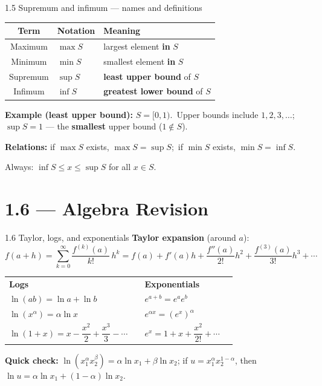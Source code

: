 \documentclass[11pt,aspectratio=169]{beamer}
\begin{document}
\begin{frame}{1.5 Supremum and infimum --- names and definitions}
  \scriptsize
  \begin{tabular}{@{}clp{}@{}}
    \toprule
    \textbf{Term} & \textbf{Notation} & \textbf{Meaning} \\
    \midrule
    Maximum & $\max S$ & largest element \textbf{in} $S$ \\
    Minimum & $\min S$ & smallest element \textbf{in} $S$ \\
    Supremum & $\sup S$ & \textbf{least upper bound} of $S$ \\
    Infimum & $\inf S$ & \textbf{greatest lower bound} of $S$ \\
    \bottomrule
  \end{tabular}

  \medskip
  \textbf{Example (least upper bound):}\quad
  $S=[0,1)$.\ Upper bounds include $1,2,3,\ldots$;
  $\sup S=1$ --- the \textbf{smallest} upper bound ($1\notin S$).

  \medskip
  \textbf{Relations:}\quad
  if $\max S$ exists, $\max S=\sup S$;\ if $\min S$ exists, $\min S=\inf S$.

  \smallskip
  \hspace{2.1em}Always: $\inf S\le x\le\sup S$ for all $x\in S$.
\end{frame}

\section{1.6 --- Algebra Revision}

\begin{frame}{1.6 Taylor, logs, and exponentials}
  \scriptsize
  \textbf{Taylor expansion} (around $a$):
  \[
    f(a+h)=\sum_{k=0}^{\infty}\frac{f^{(k)}(a)}{k!}\,h^k
    =f(a)+f'(a)h+\frac{f''(a)}{2!}h^2+\frac{f^{(3)}(a)}{3!}h^3+\cdots
  \]

  \medskip
  \begin{tabular}{@{}ll@{\quad}ll@{}}
    \textbf{Logs} & & \textbf{Exponentials} & \\
    $\ln(ab)=\ln a+\ln b$ & & $e^{a+b}=e^a e^b$ & \\
    $\ln(x^\alpha)=\alpha\ln x$ & & $e^{\alpha x}=(e^x)^\alpha$ & \\
    $\ln(1+x)=x-\dfrac{x^2}{2}+\dfrac{x^3}{3}-\cdots$ & & $e^x=1+x+\dfrac{x^2}{2!}+\cdots$ & \\
  \end{tabular}

  \medskip
  \textbf{Quick check:}\quad
  $\ln(x_1^\alpha x_2^\beta)=\alpha\ln x_1+\beta\ln x_2$;\quad
  if $u=x_1^\alpha x_2^{1-\alpha}$, then
  $\ln u=\alpha\ln x_1+(1-\alpha)\ln x_2$.
\end{frame}
\end{document}
